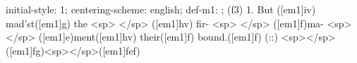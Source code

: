 initial-style: 1;
centering-scheme: english;
def-m1: \grealign;
(f3) 1. But ([em1]iv) mad'st([em1]g) the <sp> </sp> ([em1]hv) fir- <sp> </sp> ([em1]f)ma- <sp> </sp> ([em1]e)ment([em1]hv) their([em1]f) bound.([em1]f) (::) <sp></sp>([em1]fg)<sp></sp>([em1]fef)